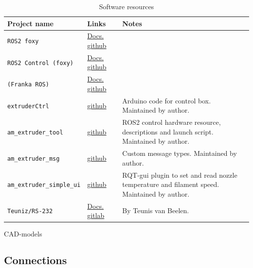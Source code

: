 \documentclass[10pt]{article}
\newcommand{\tabrowA}{\rowcolor{tabrowcolorA}}
\begin{document}
\begin{table}[h]
	\centering
	{
	\captionsetup{width=\linewidth}
	\caption{Software resources}
	\label{}
	}
	\vspace{-0.6em}
	\setlength\tabcolsep{6pt} %
	\begin{tabular}{p{0.25\linewidth}p{0.15\linewidth}p{0.6\linewidth}}
	\toprule
	Project name & Links & Notes \\
	\midrule
	\tabrowA \texttt{ROS2 foxy} & \href{https://docs.ros.org/en/foxy}{Docs.} \href{https://github.com/ros2}{github} & \\[3pt]
	\texttt{ROS2 Control (foxy)} & \href{https://control.ros.org/index}{Docs.} \href{https://github.com/ros-controls/ros2_control}{github} & \\[3pt]
	\tabrowA \texttt{(Franka ROS)} & \href{https://frankaemika.github.io/docs/franka_ros}{Docs.} \href{https://github.com/frankaemika}{github} & \\[3pt]
	\texttt{extruderCtrl} & \href{https://github.com/mltmyr/extruderCtrl}{github} & Arduino code for control box. Maintained by author. \\[3pt]
	\tabrowA \texttt{am\_extruder\_tool} & \href{https://github.com/mltmyr/am_extruder_tool}{github} & ROS2 control hardware resource, descriptions and launch script. Maintained by author. \\[3pt]
	\texttt{am\_extruder\_msg} & \href{https://github.com/mltmyr/am_extruder_msg}{github} & Custom message types. Maintained by author. \\[3pt]
	\tabrowA \texttt{am\_extruder\_simple\_ui} & \href{https://github.com/mltmyr/am_extruder_simple_ui}{github} & RQT-gui plugin to set and read nozzle temperature and filament speed. Maintained by author. \\[3pt]
	\texttt{Teuniz/RS-232} & \href{https://www.teuniz.net/RS-232/}{Docs.} \href{https://gitlab.com/Teuniz/RS-232}{gitlab} & By Teunis van Beelen. \\[3pt]
	\bottomrule
	\end{tabular}
\end{table}

CAD-models


\subsection{Connections}
\end{document}
